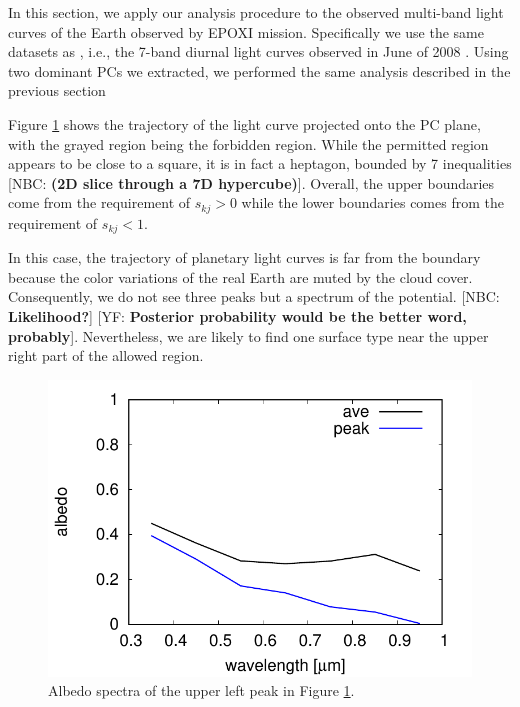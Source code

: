 \documentclass[iop,numberedappendix,apj,]{emulateapj}
\def\memoYF#1{\color{red}[YF: {\bf #1}]\color{black}}
\def\memoNBC#1{\color{blue}[NBC: {\bf #1}]\color{black}}
\begin{document}
In this section, we apply our analysis procedure to the observed multi-band light curves of the Earth observed by EPOXI mission. 
Specifically we use the same datasets as \citet{Cowan2013}, i.e., the 7-band diurnal light curves observed in June of 2008 \citep{Livengood2011}. 
Using two dominant PCs we extracted, we performed the same analysis described in the previous section 

Figure \ref{fig:EPOXI} shows the trajectory of the light curve projected onto the PC plane, with the grayed region being the forbidden region. 
While the permitted region appears to be close to a square, it is in fact a heptagon, bounded by 7 inequalities \memoNBC{(2D slice through a 7D hypercube)}. 
Overall, the upper boundaries come from the requirement of $s_{kj}>0$ while the lower boundaries comes from the requirement of $s_{kj}<1$. 

In this case, the trajectory of planetary light curves is far from the boundary because the color variations of the real Earth are muted by the cloud cover. 
Consequently, we do not see three peaks but a spectrum of the potential. \memoNBC{Likelihood?} \memoYF{Posterior probability would be the better word, probably}. 
Nevertheless, we are likely to find one surface type near the upper right part of the allowed region. 

\begin{figure}[tbh!]
    \begin{center}
	\includegraphics[width=\hsize]{raddata_2_norm_Mj_PCs.pdf}
    \end{center}
    \caption{Albedo spectra of the upper left peak in Figure \ref{fig:EPOXI}. }
\label{fig:EPOXI}
\end{figure}
\end{document}
